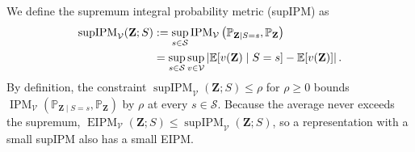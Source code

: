 \documentclass{article} %
\begin{document}
We define the supremum integral probability metric (supIPM) as
\begin{align}
  \operatorname{supIPM}_{\mathcal{V}}(\mathbf{Z};S)
  &:=\sup_{s\in\mathcal{S}}
  \operatorname{IPM}_{\mathcal{V}}
  \left(\mathbb{P}_{\mathbf{Z}\mid S=s},\mathbb{P}_{\mathbf{Z}}\right) \notag\\
  &=\sup_{s\in\mathcal{S}}\sup_{v\in\mathcal{V}}
  \left|
    \mathbb{E}\!\left[v(\mathbf{Z})\mid S=s\right]
    -\mathbb{E}\!\left[v(\mathbf{Z})\right]
  \right|.
  \label{eq:supipm}
\end{align}
By definition, the constraint $\operatorname{supIPM}_{\mathcal{V}}(\mathbf{Z};S)\le\rho$ for $\rho\ge0$ bounds 
$\operatorname{IPM}_{\mathcal{V}}(\mathbb{P}_{\mathbf{Z}\mid S=s},\mathbb{P}_{\mathbf{Z}})$ by $\rho$ at every $s\in\mathcal{S}$.
Because the average never exceeds the supremum, $\operatorname{EIPM}_{\mathcal{V}}(\mathbf{Z};S)\le\operatorname{supIPM}_{\mathcal{V}}(\mathbf{Z};S)$, so a representation with a small supIPM also has a small EIPM.
\end{document}
